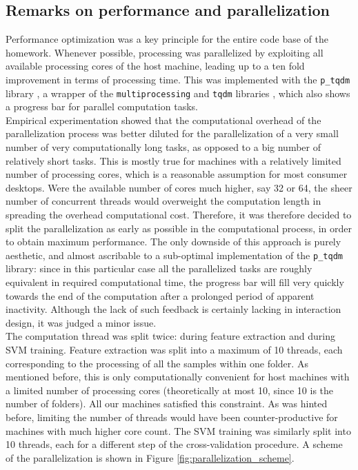 \documentclass{article}
\newcommand{\code}{\texttt}
\begin{document}
\subsection{Remarks on performance and parallelization}
Performance optimization was a key principle for the entire code base of the homework. Whenever possible, processing was parallelized by exploiting all available processing cores of the host machine, leading up to a ten fold improvement in terms of processing time. This was implemented with the \code{p\_tqdm} library \cite{pTdqm}, a wrapper of the \code{multiprocessing} and \code{tqdm} libraries \cite{pathos}\cite{tdqm}, which also shows a progress bar for parallel computation tasks.\\
Empirical experimentation showed that the computational overhead of the parallelization process was better diluted for the parallelization of a very small number of very computationally long tasks, as opposed to a big number of relatively short tasks. This is mostly true for machines with a relatively limited number of processing cores, which is a reasonable assumption for most consumer desktops. Were the available number of cores much higher, say 32 or 64, the sheer number of concurrent threads would overweight the computation length in spreading the overhead computational cost. Therefore, it was therefore decided to split the parallelization as early as possible in the computational process, in order to obtain maximum performance. The only downside of this approach is purely aesthetic, and almost ascribable to a sub-optimal implementation of the \code{p\_tqdm} library: since in this particular case all the parallelized tasks are roughly equivalent in required computational time, the progress bar will fill very quickly towards the end of the computation after a prolonged period of apparent inactivity. Although the lack of such feedback is certainly lacking in interaction design, it was judged a minor issue.\\
The computation thread was split twice: during feature extraction and during SVM training. Feature extraction was split into a maximum of 10 threads, each corresponding to the processing of all the samples within one folder. As mentioned before, this is only computationally convenient for host machines with a limited number of processing cores (theoretically at most 10, since 10 is the number of folders). All our machines satisfied this constraint. As was hinted before, limiting the number of threads would have been counter-productive for machines with much higher core count. The SVM training was similarly split into 10 threads, each for a different step of the cross-validation procedure. A scheme of the parallelization is shown in Figure \ref{fig:parallelization_scheme}.
\end{document}

